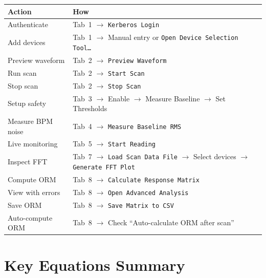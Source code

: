 \documentclass[11pt,a4paper,twoside]{report}
\newcommand{\btn}[1]{\colorbox{accent!12}{\texttt{\small #1}}}
\begin{document}
\begin{center}
\small
\begin{tabularx}{0.95\textwidth}{>{\raggedright\arraybackslash}p{3.5cm}X}
  \toprule
  \textbf{Action} & \textbf{How} \\
  \midrule
  Authenticate         & Tab~1 $\to$ \btn{Kerberos Login} \\
  Add devices          & Tab~1 $\to$ Manual entry or \btn{Open Device Selection Tool\ldots} \\
  Preview waveform     & Tab~2 $\to$ \btn{Preview Waveform} \\
  Run scan             & Tab~2 $\to$ \btn{Start Scan} \\
  Stop scan            & Tab~2 $\to$ \btn{Stop Scan} \\
  Setup safety         & Tab~3 $\to$ Enable $\to$ Measure Baseline $\to$ Set Thresholds \\
  Measure BPM noise    & Tab~4 $\to$ \btn{Measure Baseline RMS} \\
  Live monitoring      & Tab~5 $\to$ \btn{Start Reading} \\
  Inspect FFT          & Tab~7 $\to$ \btn{Load Scan Data File} $\to$ Select devices $\to$ \btn{Generate FFT Plot} \\
  Compute ORM          & Tab~8 $\to$ \btn{Calculate Response Matrix} \\
  View with errors     & Tab~8 $\to$ \btn{Open Advanced Analysis} \\
  Save ORM             & Tab~8 $\to$ \btn{Save Matrix to CSV} \\
  Auto-compute ORM     & Tab~8 $\to$ Check ``Auto-calculate ORM after scan'' \\
  \bottomrule
\end{tabularx}
\end{center}

\chapter{Key Equations Summary}\label{app:equations}
\end{document}
